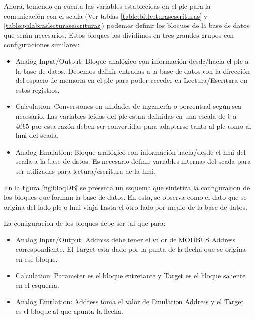 Ahora, teniendo en cuenta las variables establecidas en el \gls{plc} 
para la comunicación con el \gls{scada} (Ver 
tablas \ref{table:bitlecturasescrituras} y 
\ref{table:palabraslecturasescrituras}) podemos definir los bloques de la base 
de datos que serán necesarios. Estos bloques los dividimos en tres 
grandes grupos con configuraciones similares:
 
\begin{itemize}
 \item Analog Input/Output: Bloque analógico con información desde/hacia el 
  \gls{plc} a la base de datos. Debemos definir entradas a la base de datos con 
  la dirección del espacio de memoria en el \gls{plc} para poder acceder en 
  Lectura/Escritura en estos registros.
 \item Calculation:  Conversiones en unidades de ingeniería o porcentual 
  según sea necesario. Las variables leídas del \gls{plc} estan definidas en 
  una escala de $0$ a $4095$ por esta razón deben ser convertidas para
adaptarse tanto al \gls{plc} como al \gls{hmi} del \gls{scada}.
 \item Analog Emulation: Bloque analógico con información hacia/desde el 
  \gls{hmi} del \gls{scada} a la base de datos. Es necesario definir variables 
  internas del \gls{scada} para ser utilizadas para lectura/escritura de la 
  \gls{hmi}.
\end{itemize}

En la figura \ref{fig:bloqDB} se presenta un esquema que sintetiza la 
configuracion de los bloques que forman la base de datos. En esta, se observa 
como el dato que se origina del lado \gls{plc} o \gls{hmi} viaja hasta el otro 
lado por medio de la base de datos.



La configuracion de los bloques debe ser tal que para:
\begin{itemize}
  \item Analog Input/Output: Address debe tener el valor de MODBUS Address 
  correspondiente. El Target esta dado por la punta de la flecha que se origina 
  en ese bloque.
  \item Calculation: Parameter es el bloque entretante y Target es el bloque 
  saliente en el esquema.
  \item Analog Emulation: Address toma el valor de Emulation Address y el 
  Target es el bloque al que apunta la flecha. 
\end{itemize}



